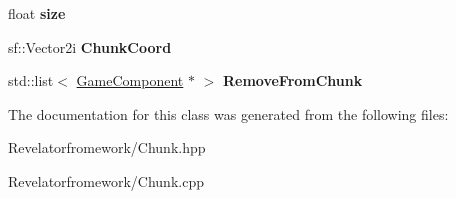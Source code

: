 \begin{DoxyCompactItemize}
\item 
\hypertarget{class_chunk_af46410b580baf2985b01044d5c041b2e}{float {\bfseries size}}\label{class_chunk_af46410b580baf2985b01044d5c041b2e}

\item 
\hypertarget{class_chunk_abb5b1842148b3d7c616065766bfd2b33}{sf\-::\-Vector2i {\bfseries Chunk\-Coord}}\label{class_chunk_abb5b1842148b3d7c616065766bfd2b33}

\item 
\hypertarget{class_chunk_adf6692fdab4518524e217cc0ef09d282}{std\-::list$<$ \hyperlink{class_game_component}{Game\-Component} $\ast$ $>$ {\bfseries Remove\-From\-Chunk}}\label{class_chunk_adf6692fdab4518524e217cc0ef09d282}

\end{DoxyCompactItemize}


The documentation for this class was generated from the following files\-:\begin{DoxyCompactItemize}
\item 
Revelatorfromework/Chunk.\-hpp\item 
Revelatorfromework/Chunk.\-cpp\end{DoxyCompactItemize}
